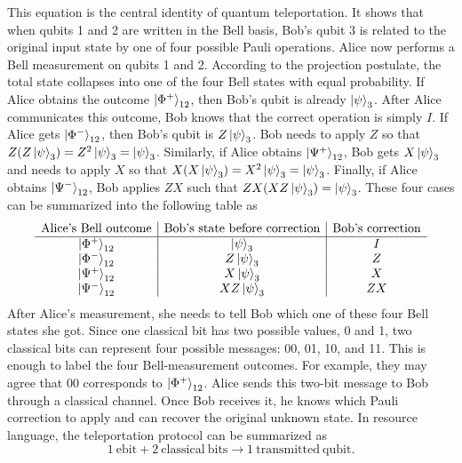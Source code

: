 \documentclass[aps,prd,preprint,floats,epsf,superscriptaddress,nofootinbib]{revtex4}
\begin{document}
This equation is the central identity of quantum teleportation. It shows that when qubits 1 and 2 are written in the Bell basis, Bob's qubit 3 is related to the original input state by one of four possible Pauli operations. Alice now performs a Bell measurement on qubits 1 and 2. According to the projection postulate, the total state collapses into one of the four Bell states with equal probability. If Alice obtains the outcome $\ket{\Phi^+}_{12}$, then Bob's qubit is already $\ket{\psi}_3$. After Alice communicates this outcome, Bob knows that the correct operation is simply $I$. If Alice gets $\ket{\Phi^-}_{12}$, then Bob's qubit is $Z\ket{\psi}_3$. Bob needs to apply $Z$ so that $Z(Z\ket{\psi}_3)=Z^2\ket{\psi}_3=\ket{\psi}_3$. Similarly, if Alice obtains $\ket{\Psi^+}_{12}$, Bob gets $X\ket{\psi}_3$ and needs to apply $X$ so that $X(X\ket{\psi}_3)=X^2\ket{\psi}_3=\ket{\psi}_3$. Finally, if Alice obtains $\ket{\Psi^-}_{12}$, Bob applies $ZX$ such that $ZX(XZ\ket{\psi}_3)=\ket{\psi}_3$. These four cases can be summarized into the following table as \begin{equation}
\begin{array}{c|c|c}
\text{Alice's Bell outcome} 
& \text{Bob's state before correction} 
& \text{Bob's correction} \\
\hline
\ket{\Phi^+}_{12} & \ket{\psi}_3 & I \\
\ket{\Phi^-}_{12} & Z\ket{\psi}_3 & Z \\
\ket{\Psi^+}_{12} & X\ket{\psi}_3 & X \\
\ket{\Psi^-}_{12} & XZ\ket{\psi}_3 & ZX
\end{array}
\label{Eq:teleportation_correction_table}
\end{equation}
After Alice's measurement, she needs to tell Bob which one of these four Bell states she got. Since one classical bit has two possible values, 0 and 1, two classical bits can represent four possible messages: 00, 01, 10, and 11. This is enough to label the four Bell-measurement outcomes. For example, they may agree that 00 corresponds to $\ket{\Phi^+}_{12}$. Alice sends this two-bit message to Bob through a classical channel. Once Bob receives it, he knows which Pauli correction to apply and can recover the original unknown state. In resource language, the teleportation protocol can be summarized as
\begin{equation}
  1\ \mathrm{ebit}+2\ \mathrm{classical \ bits}\to 1\ \mathrm{transmitted\ qubit}.
\end{equation}
\end{document}
